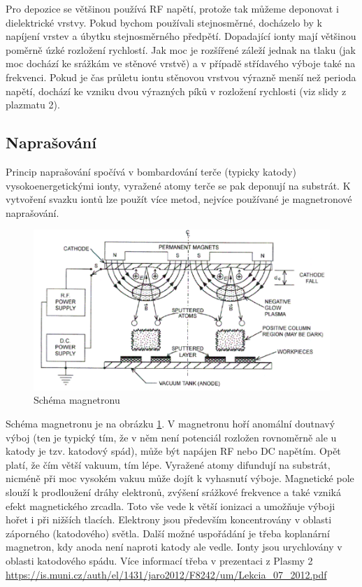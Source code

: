 \documentclass[12pt]{article}
\begin{document}
Pro depozice se většinou používá RF napětí, protože tak můžeme deponovat i dielektrické vrstvy. Pokud bychom používali stejnosměrné, docházelo by k napíjení vrstev a úbytku stejnosměrného předpětí. Dopadající ionty mají většinou poměrně úzké rozložení rychlostí. Jak moc je rozšířené záleží jednak na tlaku (jak moc dochází ke srážkám ve stěnové vrstvě) a v případě střídavého výboje také na frekvenci. Pokud je čas průletu iontu stěnovou vrstvou výrazně menší než perioda napětí, dochází ke vzniku dvou výrazných píků v rozložení rychlosti (viz slidy z plazmatu 2).

\subsection{Naprašování}
Princip naprašování spočívá v bombardování terče (typicky katody) vysokoenergetickými ionty, vyražené atomy terče se pak deponují na substrát. K vytvoření svazku iontů lze použít více metod, nejvíce používané je magnetronové naprašování.

\begin{figure}
\centering
\includegraphics{magnetron2.png}
\caption{Schéma magnetronu}
\label{magnetron}
\end{figure}

Schéma magnetronu je na obrázku \ref{magnetron}. V magnetronu hoří anomální doutnavý výboj (ten je typický tím, že v něm není potenciál rozložen rovnoměrně ale u katody je tzv. katodový spád), může být napájen RF nebo DC napětím. Opět platí, že čím větší vakuum, tím lépe. Vyražené atomy difundují na substrát, nicméně při moc vysokém vakuu může dojít k vyhasnutí výboje. Magnetické pole slouží k prodloužení dráhy elektronů, zvýšení srážkové frekvence a také vzniká efekt magnetického zrcadla. Toto vše vede k větší ionizaci a umožňuje výboji hořet i při nižších tlacích. Elektrony jsou především koncentrovány v oblasti záporného (katodového) světla. Další možné uspořádání je třeba koplanární magnetron, kdy anoda není naproti katody ale vedle. Ionty jsou urychlovány v oblasti katodového spádu. Více informací třeba v prezentaci z Plasmy 2 \url{https://is.muni.cz/auth/el/1431/jaro2012/F8242/um/Lekcia_07_2012.pdf}
\end{document}
